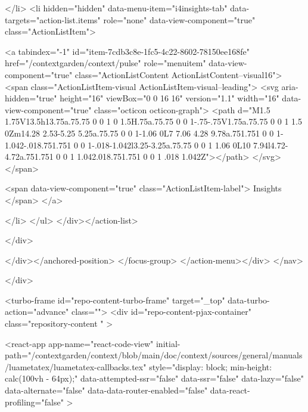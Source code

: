 </li>
        <li hidden="hidden" data-menu-item="i4insights-tab" data-targets="action-list.items" role="none" data-view-component="true" class="ActionListItem">
    
    
    <a tabindex="-1" id="item-7cdb3c8e-1fc5-4c22-8602-78150ee168fe" href="/contextgarden/context/pulse" role="menuitem" data-view-component="true" class="ActionListContent ActionListContent--visual16">
        <span class="ActionListItem-visual ActionListItem-visual--leading">
          <svg aria-hidden="true" height="16" viewBox="0 0 16 16" version="1.1" width="16" data-view-component="true" class="octicon octicon-graph">
    <path d="M1.5 1.75V13.5h13.75a.75.75 0 0 1 0 1.5H.75a.75.75 0 0 1-.75-.75V1.75a.75.75 0 0 1 1.5 0Zm14.28 2.53-5.25 5.25a.75.75 0 0 1-1.06 0L7 7.06 4.28 9.78a.751.751 0 0 1-1.042-.018.751.751 0 0 1-.018-1.042l3.25-3.25a.75.75 0 0 1 1.06 0L10 7.94l4.72-4.72a.751.751 0 0 1 1.042.018.751.751 0 0 1 .018 1.042Z"></path>
</svg>
        </span>
      
        <span data-view-component="true" class="ActionListItem-label">
          Insights
</span>      
</a>
  
</li>
</ul>    
</div></action-list>


</div>
      
</div></anchored-position>  </focus-group>
</action-menu></div>
</nav>

  </div>

  



<turbo-frame id="repo-content-turbo-frame" target="_top" data-turbo-action="advance" class="">
    <div id="repo-content-pjax-container" class="repository-content " >
    



    
      
    








<react-app
  app-name="react-code-view"
  initial-path="/contextgarden/context/blob/main/doc/context/sources/general/manuals/luametatex/luametatex-callbacks.tex"
    style="display: block; min-height: calc(100vh - 64px);"
  data-attempted-ssr="false"
  data-ssr="false"
  data-lazy="false"
  data-alternate="false"
  data-data-router-enabled="false"
  data-react-profiling="false"
>
  
